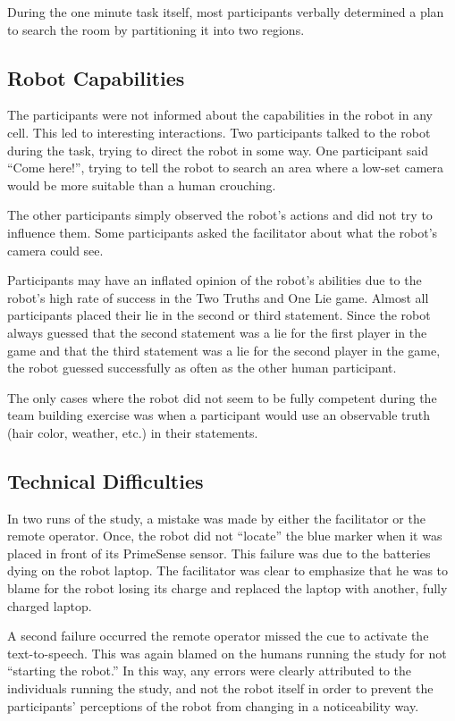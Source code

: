 \documentclass{acm_proc_article-sp}
\begin{document}
During the one minute task itself, most participants verbally determined a plan to search the room by partitioning it into two regions. 

\subsection{Robot Capabilities}
\label{subsection:robot-capabilities}
The participants were not informed about the capabilities in the robot in any cell. This led to interesting interactions. Two participants talked to the robot during the task, trying to direct the robot in some way. One participant said ``Come here!'', trying to tell the robot to search an area where a low-set camera would be more suitable than a human crouching. 

The other participants simply observed the robot's actions and did not try to influence them. Some participants asked the facilitator about what the robot's camera could see.

Participants may have an inflated opinion of the robot's abilities due to the robot's high rate of success in the Two Truths and One Lie game. Almost all participants placed their lie in the second or third statement. Since the robot always guessed that the second statement was a lie for the first player in the game and that the third statement was a lie for the second player in the game, the robot guessed successfully as often as the other human participant. 

The only cases where the robot did not seem to be fully competent during the team building exercise was when a participant would use an observable truth (hair color, weather, etc.) in their statements. 

\subsection{Technical Difficulties}
\label{subsection:technical-difficulties}
In two runs of the study, a mistake was made by either the facilitator or the remote operator. Once, the robot did not ``locate'' the blue marker when it was placed in front of its PrimeSense sensor. This failure was due to the batteries dying on the robot laptop. The facilitator was clear to emphasize that he was to blame for the robot losing its charge and replaced the laptop with another, fully charged laptop. 

A second failure occurred the remote operator missed the cue to activate the text-to-speech. This was again blamed on the humans running the study for not ``starting the robot.'' In this way, any errors were clearly attributed to the individuals running the study, and not the robot itself in order to prevent the participants' perceptions of the robot from changing in a noticeability way. 
\end{document}
